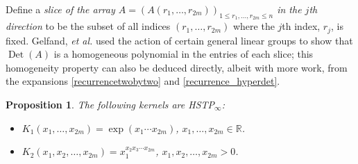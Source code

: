 \documentclass[pdftex]{sigma}
\numberwithin{equation}{section}
\newtheorem{Proposition}[Theorem]{Proposition}
 { \theoremstyle{definition}
\newtheorem{Definition}[Theorem]{Definition}
\newtheorem{Note}[Theorem]{Note}
\newtheorem{Example}[Theorem]{Example}
\newtheorem{Remark}[Theorem]{Remark} }
\def\R{{\mathbb R}}
\def\Det{\operatorname{Det}}
\begin{document}
Define a {\it slice of the array $A = (A(r_1,\dots,r_{2m}))_{1 \le r_1,\dots,r_{2m} \le n}$ in the $j$th direction} to be the subset of all indices $(r_1,\dots,r_{2m})$ where the $j$th index, $r_j$, is fixed. Gelfand, \textit{et al.} \cite[Corollary~1.5\,(b)]{GKZ1} used the action of certain general linear groups to show that $\Det(A)$ is a homogeneous polynomial in the entries of each slice; this homogeneity property can also be deduced directly, albeit with more work, from the expansions \eqref{recurrencetwobytwo} and \eqref{recurrence_hyperdet}.

\begin{Proposition}
\label{prop_exponentialexample}
The following kernels are HSTP$_\infty$:
\begin{itemize}\itemsep=0pt
\item[$(i)$] $K_1(x_1,\dots,x_{2m}) = \exp(x_1 \cdots x_{2m})$, $x_1,\dots,x_{2m} \in \R$.

\item[$(ii)$] $K_2(x_1,x_2,\dots,x_{2m}) = x_1^{x_2 x_3 \cdots x_{2m}}$, $x_1,x_2,\dots,x_{2m} > 0$.
\end{itemize}
\end{Proposition}
\end{document}
